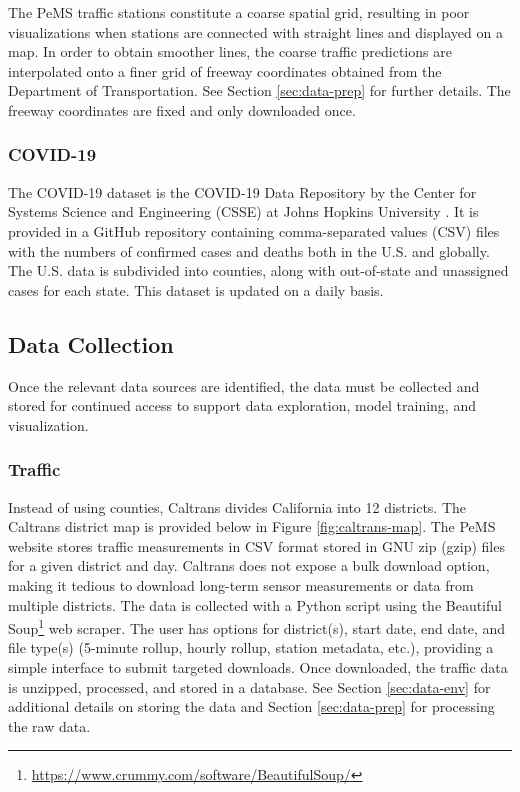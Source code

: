 \documentclass{article}
\begin{document}
The PeMS traffic stations constitute a coarse spatial grid, resulting in poor visualizations when stations are connected with straight lines and displayed on a map. In order to obtain smoother lines, the coarse traffic predictions are interpolated onto a finer grid of freeway coordinates obtained from the Department of Transportation. See Section \ref{sec:data-prep} for further details. The freeway coordinates are fixed and only downloaded once.

\subsubsection{COVID-19}

The COVID-19 dataset is the COVID-19 Data Repository by the Center for Systems Science and Engineering (CSSE) at Johns Hopkins University \cite{dong2020covid}. It is provided in a GitHub repository containing comma-separated values (CSV) files with the numbers of confirmed cases and deaths both in the U.S. and globally. The U.S. data is subdivided into counties, along with out-of-state and unassigned cases for each state. This dataset is updated on a daily basis.

\subsection{Data Collection}
\label{sec:data-collect}

Once the relevant data sources are identified, the data must be collected and stored for continued access to support data exploration, model training, and visualization.

\subsubsection{Traffic}
\label{sec:data-collect-traffic}

Instead of using counties, Caltrans divides California into 12 districts. The Caltrans district map is provided below in Figure \ref{fig:caltrans-map}. The PeMS website stores traffic measurements in CSV format stored in GNU zip (gzip) files for a given district and day. Caltrans does not expose a bulk download option, making it tedious to download long-term sensor measurements or data from multiple districts. The data is collected with a Python script using the Beautiful Soup\footnote{\url{https://www.crummy.com/software/BeautifulSoup/}} web scraper. The user has options for district(s), start date, end date, and file type(s) (5-minute rollup, hourly rollup, station metadata, etc.), providing a simple interface to submit targeted downloads. Once downloaded, the traffic data is unzipped, processed, and stored in a database. See Section \ref{sec:data-env} for additional details on storing the data and Section \ref{sec:data-prep} for processing the raw data.
\end{document}
